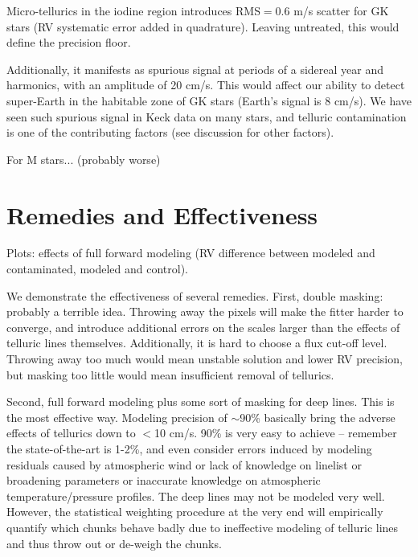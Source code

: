 \documentclass{emulateapj}
\begin{document}
\begin{CJK*}{UTF8}{gbsn}
Micro-tellurics in the iodine region introduces RMS$=0.6$ m/s scatter
for GK stars (RV systematic error added in quadrature). Leaving
untreated, this would define the precision floor.

Additionally, it manifests as spurious signal at periods of a sidereal
year and harmonics, with an amplitude of 20 cm/s. This would affect
our ability to detect super-Earth in the habitable zone of GK stars
(Earth's signal is 8 cm/s). We have seen such spurious signal in Keck
data on many stars, and telluric contamination is one of the
contributing factors (see discussion for other factors).

For M stars... (probably worse)


\section{Remedies and Effectiveness}

Plots: effects of full forward modeling (RV difference between modeled
and contaminated, modeled and control).

We demonstrate the effectiveness of several remedies. First, double
masking: probably a terrible idea. Throwing away the pixels will make
the fitter harder to converge, and introduce additional errors on the
scales larger than the effects of telluric lines
themselves. Additionally, it is hard to choose a flux cut-off
level. Throwing away too much would mean unstable solution and lower
RV precision, but masking too little would mean insufficient
removal of tellurics.

Second, full forward modeling plus some sort of masking for deep
lines. This is the most effective way. Modeling precision of
$\sim$90\% basically bring the adverse effects of tellurics down to
$<$10 cm/s. 90\% is very easy to achieve -- remember the
state-of-the-art is 1-2\%, and even consider errors induced by
modeling residuals caused by atmospheric wind or lack of knowledge on
linelist or broadening parameters or inaccurate knowledge on atmospheric
temperature/pressure profiles. The deep lines may not be modeled very
well. However, the statistical weighting procedure at the very end
will empirically quantify which chunks behave badly due to ineffective
modeling of telluric lines and thus throw out or de-weigh the chunks.




\end{CJK*}
\end{document}
